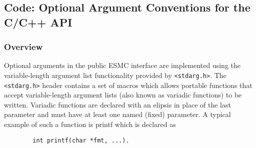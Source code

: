 
\subsection{Code: Optional Argument Conventions for the C/C++ API}


\subsubsection{Overview}

Optional arguments in the public ESMC interface are implemented using the
variable-length argument list functionality provided by \texttt{<stdarg.h>}.
The \texttt{<stdarg.h>} header contains a set of macros which allows portable
functions that accept variable-length argument lists (also known as variadic
functions) to be written. Variadic functions are declared with an elipsis in
place of the last parameter and must have at least one named (fixed) parameter.
A typical example of such a function is printf which is declared as

\begin{verbatim}
        int printf(char *fmt, ...).
\end{verbatim}

